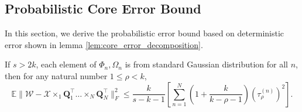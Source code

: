 \subsection{Probabilistic Core Error Bound}
In this section, we derive the probabilistic error bound based on deterministic error shown in lemma \ref{lem:core_error_decomposition}. 
\begin{lem}
\label{lemma:err_core_sketch}
If $s>2k$, each element of $\Phi_n, \Omega_n$ is from standard Gaussian distribution for all $n$, then for any natural number $1\le \rho<k$, 
\begin{equation}
\mathbb{E} \|\mathscr{W} - \mathscr{X}\times_1 \mathbf{Q}_1^\top \dots \times_N \mathbf{Q}_N^\top\|_F^2 \le \frac{k}{s-k-1} \left[ \sum_{n=1}^N \left(1+\frac{k}{k-\rho-1}\right)(\tau^{(n)}_\rho)^2\right]. 
\end{equation}
\end{lem}
